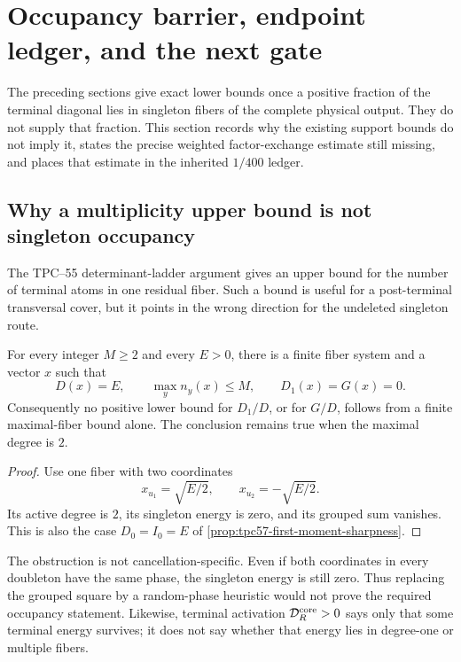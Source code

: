 \section{Occupancy barrier, endpoint ledger, and the next gate}
\label{sec:tpc57-endpoint-claims}

The preceding sections give exact lower bounds once a positive fraction of
the terminal diagonal lies in singleton fibers of the complete physical
output.  They do not supply that fraction.  This section records why the
existing support bounds do not imply it, states the precise weighted
factor-exchange estimate still missing, and places that estimate in the
inherited \(1/400\) ledger.

\subsection{Why a multiplicity upper bound is not singleton occupancy}

The TPC--55 determinant-ladder argument gives an upper bound for the number
of terminal atoms in one residual fiber.  Such a bound is useful for a
post-terminal transversal cover, but it points in the wrong direction for
the undeleted singleton route.

\begin{proposition}
\label{prop:tpc57-occupancy-barrier}
For every integer \(M\ge2\) and every \(E>0\), there is a finite fiber
system and a vector \(x\) such that
\begin{equation}
 D(x)=E,
 \qquad
 \max_y n_y(x)\le M,
 \qquad
 D_1(x)=G(x)=0.
 \label{eq:tpc57-bounded-degree-zero-singleton}
\end{equation}
Consequently no positive lower bound for \(D_1/D\), or for \(G/D\), follows
from a finite maximal-fiber bound alone.  The conclusion remains true when
the maximal degree is \(2\).
\end{proposition}

\begin{proof}
Use one fiber with two coordinates
\[
 x_{u_1}=\sqrt{E/2},
 \qquad
 x_{u_2}=-\sqrt{E/2}.
\]
Its active degree is \(2\), its singleton energy is zero, and its grouped
sum vanishes.  This is also the case \(D_0=I_0=E\) of
\cref{prop:tpc57-first-moment-sharpness}.
\end{proof}

The obstruction is not cancellation-specific.  Even if both coordinates
in every doubleton have the same phase, the singleton energy is still zero.
Thus replacing the grouped square by a random-phase heuristic would not
prove the required occupancy statement.  Likewise, terminal activation
\(\mathcal D_R^{\rm core}>0\) says only that some terminal energy survives; it does
not say whether that energy lies in degree-one or multiple fibers.

